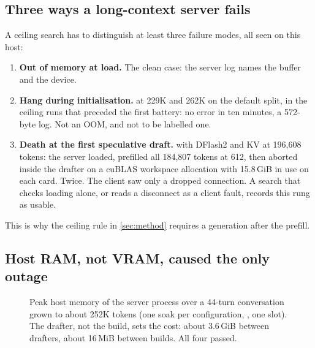 \subsection{Three ways a long-context server fails}
A ceiling search has to distinguish at least three failure modes, all seen on this host:
\begin{enumerate}
\item \textbf{Out of memory at load.} The clean case: the server log names the buffer and the device.
\item \textbf{Hang during initialisation.} \Qfour{} at 229K and 262K on the default split, in the
ceiling runs that preceded the first battery: no error in ten minutes, a 572-byte log. Not an OOM, and not to be labelled
one.
\item \textbf{Death at the first speculative draft.} \Qfour{} with DFlash2 and  KV at
196{,}608 tokens: the server loaded, prefilled all 184{,}807 tokens at 612\tps{}, then aborted inside
the drafter on a cuBLAS workspace allocation with 15.8\,GiB in use on each card. Twice. The client saw
only a dropped connection. A search that checks loading alone, or reads a disconnect as a client
fault, records this rung as usable.
\end{enumerate}
This is why the ceiling rule in \cref{sec:method} requires a generation after the prefill.

\subsection{Host RAM, not VRAM, caused the only outage}\label{sec:hostram}

\begin{figure}[t]
\centering
{}
\caption{Peak host memory of the server process over a 44-turn conversation grown to about 252K
tokens (one soak per configuration, , one slot). The drafter, not the build, sets the
cost: about 3.6\,GiB between drafters, about 16\,MiB between builds. All four passed.}\label{fig:hostram}
\end{figure}


